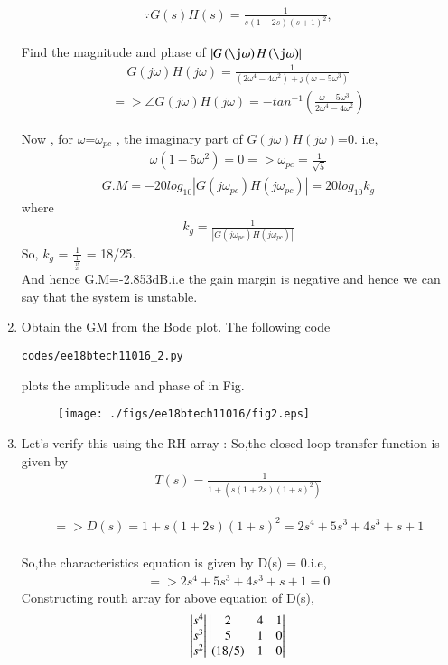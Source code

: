 \begin{enumerate}[label=\thesection.\arabic*.,ref=\thesection.\theenumi]
\begin{align}
\because G(s)H(s)=\frac{1}{s(1+2s)(s+1)^{2}},
\end{align}

Find the magnitude and phase of $\abs{G\brak{\j\omega}H\brak{\j\omega}}$
\begin{align}
G(j\omega)H(j\omega) = \frac{1}{(2\omega^4-4\omega^2) +j(\omega-5\omega^3)}
\end{align}
\begin{align}
=> \angle G(j\omega)H(j\omega) = -tan^{-1}(\frac{\omega-5\omega^3}{2\omega^4-4\omega^2})
\end{align}

Now , for $\omega$=$\omega_{pc}$ , the imaginary part of $G(j\omega)H(j\omega)$=0. i.e,
\begin{align}
\omega(1-5\omega^2)=0
=>\omega_{pc} = \frac{1}{\sqrt{5}}
\end{align}
\begin{align}
G.M = -20log_{10}|G(j\omega_{pc})H(j\omega_{pc})| = 20log_{10}k_{g}
\end{align}
where 
\begin{align}
k_{g}=\frac{1}{|G(j\omega_{pc})H(j\omega_{pc})|}
\end{align}
So, $k_{g}$ = $\frac{1}{\frac{1}{\frac{18}{25}}}$ = 18/25.
\\

And hence G.M=-2.853dB.i.e the gain margin is negative and hence we can say that the system is unstable.

\item Obtain the GM from the Bode plot.
\solution The following code 
\begin{lstlisting}
codes/ee18btech11016_2.py
\end{lstlisting}
plots the amplitude and phase of in Fig.
\begin{figure}[htp]
	\centering
	\texttt{[image: ./figs/ee18btech11016/fig2.eps]}
	\caption{}
	\label{fig:ee18btech11016}
\end{figure}

\item 
Let's verify this using the RH array :
So,the closed loop transfer function is given by 
\begin{align}
T(s) = \frac{1}{1 + (s(1+2s)(1+s)^2)}
\end{align}

\begin{align}
=> D(s) = 1 + s(1+2s)(1+s)^2 = 2s^4+5s^3+4s^3+s+1
\end{align}
\\
So,the characteristics equation is given by D(s) = 0.i.e,
\begin{align}
=> 2s^4 + 5s^3 + 4s^3 + s + 1 = 0 
\end{align}
Constructing routh array for above equation of D(s),
\begin{align}
\begin{vmatrix}s^4\\s^3\\s^2\end{vmatrix}
\begin{vmatrix}2 & 4 & 1 \\ 5 & 1 & 0 \\ (18/5) & 1 & 0\end{vmatrix}
\end{align}


\end{enumerate}
